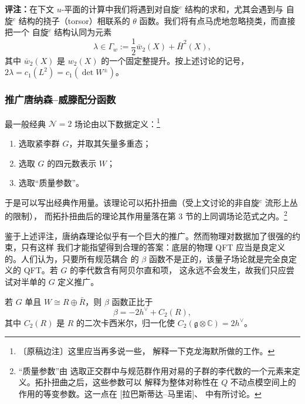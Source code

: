 \textbf{评注：}在下文 $u$-平面的计算中我们将遇到对自旋$^c$ 结构的求和，尤其会遇到与
自旋$^c$ 结构的挠子（torsor）相联系的 $\theta$ 函数。我们将有点马虎地忽略挠类，而直接把一个
自旋$^c$ 结构认同为元素
\begin{equation}
  \lambda\in\Gamma_{w}:=\frac{1}{2}\bar{w}_{2}(X)+\bar{H}^{2}(X),
  \tag{4.75}
\end{equation}
其中 $\bar{w}_{2}(X)$ 是 $w_{2}(X)$ 的一个固定整提升。按上述讨论的记号，
$2\lambda=c_{1}(L^{2})=c_{1}(\det W^{\pm})$。

\subsubsection{推广唐纳森--威滕配分函数}
\label{sec:4-7-3}


最一般经典 $\mathcal{N}=2$ 场论由以下数据定义：\footnote{〔原稿边注〕这里应当再多说一些，
解释一下克龙海默所做的工作。}
\begin{enumerate}[label=\arabic*., leftmargin=2.2em]
  \item 选取紧李群 $G$，并取其矢量多重态；
  \item 选取 $G$ 的四元数表示 $W$；
  \item 选取“质量参数”。
\end{enumerate}
于是可以写出经典作用量。该理论可以拓扑扭曲（受上文讨论的非自旋$^c$ 流形上丛的限制），
而拓扑扭曲后的理论其作用量落在第 3 节的上同调场论范式之内。\footnote{“质量参数”由
选取正交群中与规范群作用对易的子群的李代数的一个元素来定义。拓扑扭曲之后，这些参数可以
解释为整体对称性在 $Q$ 不动点模空间上的作用的等变参数。这一点在
[拉巴斯蒂达--马里诺]、\cite{ref26}\cite{ref24} 中有所讨论。}

鉴于上述评注，唐纳森理论似乎有一个巨大的推广。然而物理对数据加了很强的约束，只有这样
我们才能指望得到合理的答案：底层的物理 QFT 应当是良定义的。人们认为，只要所有规范耦合
的 $\beta$ 函数不是正的，该量子场论就是完全良定义的 QFT。若 $G$ 的李代数含有阿贝尔直和项，
这永远不会发生，故我们只应尝试对半单的 $G$ 定义推广。

若 $G$ 单且 $W\cong R\oplus\bar R$，则 $\beta$ 函数正比于
\begin{equation}
  \beta=-2h^{\vee}+C_{2}(R),
  \tag{4.76}
\end{equation}
其中 $C_{2}(R)$ 是 $R$ 的二次卡西米尔，归一化使 $C_{2}(\mathfrak{g}\otimes\mathbb{C})
=2h^{\vee}$。

